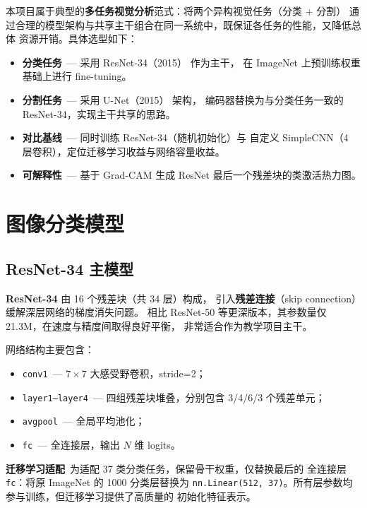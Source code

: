 \documentclass[12pt, a4paper, openany]{ctexbook}
\begin{document}
本项目属于典型的\textbf{多任务视觉分析}范式：将两个异构视觉任务（分类 + 分割）
通过合理的模型架构与共享主干组合在同一系统中，既保证各任务的性能，又降低总体
资源开销。具体选型如下：

\begin{itemize}[leftmargin=*]
  \item \textbf{分类任务}\ — 采用 ResNet-34（2015）\cite{he2016resnet} 作为主干，
        在 ImageNet 上预训练权重基础上进行 fine-tuning。
  \item \textbf{分割任务}\ — 采用 U-Net（2015）\cite{ronneberger2015unet} 架构，
        编码器替换为与分类任务一致的 ResNet-34，实现主干共享的思路。
  \item \textbf{对比基线}\ — 同时训练 ResNet-34（随机初始化）与
        自定义 SimpleCNN（4 层卷积），定位迁移学习收益与网络容量收益。
  \item \textbf{可解释性}\ — 基于 Grad-CAM\cite{selvaraju2017gradcam} 生成
        ResNet 最后一个残差块的类激活热力图。
\end{itemize}

\section{图像分类模型}

\subsection{ResNet-34 主模型}

\textbf{ResNet-34}\cite{he2016resnet} 由 16 个残差块（共 34 层）构成，
引入\textbf{残差连接}（skip connection）缓解深层网络的梯度消失问题。
相比 ResNet-50 等更深版本，其参数量仅 21.3M，在速度与精度间取得良好平衡，
非常适合作为教学项目主干。

网络结构主要包含：

\begin{itemize}[leftmargin=*]
  \item \texttt{conv1}\ — $7 \times 7$ 大感受野卷积，stride=2；
  \item \texttt{layer1--layer4}\ — 四组残差块堆叠，分别包含 3/4/6/3 个残差单元；
  \item \texttt{avgpool}\ — 全局平均池化；
  \item \texttt{fc}\ — 全连接层，输出 $N$ 维 logits。
\end{itemize}

\textbf{迁移学习适配}\ 为适配 37 类分类任务，保留骨干权重，仅替换最后的
全连接层 \texttt{fc}：将原 ImageNet 的 1000 分类层替换为
\texttt{nn.Linear(512, 37)}。所有层参数均参与训练，但迁移学习提供了高质量的
初始化特征表示。
\end{document}
